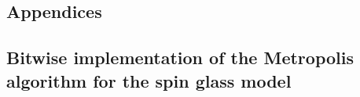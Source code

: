 \begin{appendix}
\section*{Appendices}


\renewcommand{\thesubsection}{\Alph{subsection}}


\linenumbers
\subsection{Bitwise implementation of the Metropolis algorithm for the spin glass model}
\nolinenumbers

\linenumbers
\FloatBarrier
\end{appendix}
